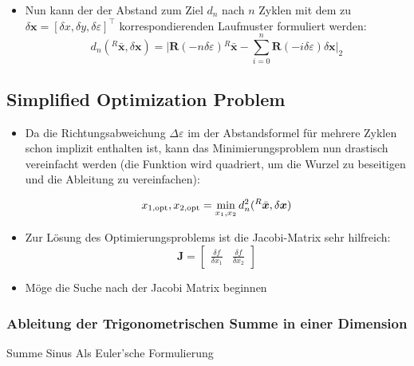 \documentclass[10pt,a4paper]{article}
\begin{document}
\begin{itemize}
	
	\item Nun kann der der Abstand zum Ziel $d_n$ nach $n$ Zyklen mit dem zu $\delta\bm{x} = [\delta x, \delta y, \delta \varepsilon]^\top$ korrespondierenden Laufmuster formuliert werden:
	\begin{equation}
	d_n({^R}\bar{\bm{x}}, \delta\bm{x}) = \bigg| \bm{R}(-n \delta\varepsilon){^R}\bar{\bm{x}} - \sum_{i=0}^n \bm{R}(- i \delta\varepsilon) \delta \bm{x} \bigg|_2
	\end{equation}
	
\end{itemize}

\subsection{Simplified Optimization Problem}

\begin{itemize}

	\item Da die Richtungsabweichung $\Delta \varepsilon$ im der Abstandsformel für mehrere Zyklen schon implizit enthalten ist, kann das Minimierungsproblem nun drastisch vereinfacht werden (die Funktion wird quadriert, um die Wurzel zu beseitigen und die Ableitung zu vereinfachen):
	
	\begin{equation}
	x_{1, \textnormal{opt}}, x_{2, \textnormal{opt}} = \min_{x_1, x_2} d^2_n({^R}\bar{\bm{x}}, \delta\bm{x})
	\end{equation}
	
	\item Zur Lösung des Optimierungsproblems ist die Jacobi-Matrix sehr hilfreich:
	\begin{equation}
	\bm{{J}} = \begin{bmatrix}
		\frac{\delta f}{\delta x_1} &
		\frac{\delta f}{\delta x_2}
	\end{bmatrix}
	\end{equation}

	\item Möge die Suche nach der Jacobi Matrix beginnen
\end{itemize}


\subsubsection{Ableitung der Trigonometrischen Summe in einer Dimension}


Summe Sinus Als Euler'sche Formulierung
\end{document}
